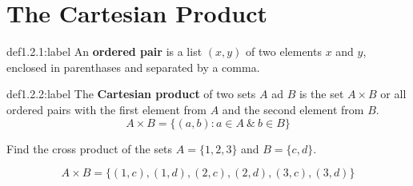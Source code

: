 \section{The Cartesian Product}

\begin{definition}{def1.2.1:label}
    An \textbf{ordered pair} is a list $(x,y)$ of two elements $x$ and $y$, enclosed in parenthases and separated by a comma. 
\end{definition}


\begin{definition}{def1.2.2:label}
    The \textbf{Cartesian product} of two sets $A$ ad $B$ is the set $A \times B$ or all ordered pairs with the first element from $A$ and the second element from $B$. \\

    $$
    A \times B = \{(a,b) : a \in A \:\&\: b \in B\}
    $$
\end{definition}


\begin{problem}
    Find the cross product of the sets $A = \{1,2,3\}$ and $B = \{c,d\}$.

    $$
    A \times B = \{(1,c), (1,d),(2,c), (2,d),(3,c), (3,d)\}
    $$
\end{problem}
